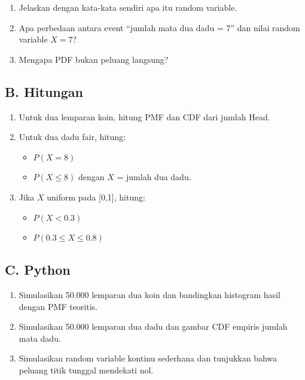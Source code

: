 \documentclass[
  letterpaper,
  DIV=11,
  numbers=noendperiod]{scrreprt}
\providecommand{\tightlist}{%
  \setlength{\itemsep}{0pt}\setlength{\parskip}{0pt}}
\begin{document}
\begin{enumerate}
\def\labelenumi{\arabic{enumi}.}
\tightlist
\item
  Jelaskan dengan kata-kata sendiri apa itu random variable.
\item
  Apa perbedaan antara event ``jumlah mata dua dadu = 7'' dan nilai
  random variable \(X=7\)?
\item
  Mengapa PDF bukan peluang langsung?
\end{enumerate}

\subsection{B. Hitungan}\label{b.-hitungan}

\begin{enumerate}
\def\labelenumi{\arabic{enumi}.}
\tightlist
\item
  Untuk dua lemparan koin, hitung PMF dan CDF dari jumlah Head.
\item
  Untuk dua dadu fair, hitung:

  \begin{itemize}
  \tightlist
  \item
    \(P(X=8)\)
  \item
    \(P(X\le 8)\) dengan \(X\) = jumlah dua dadu.
  \end{itemize}
\item
  Jika \(X\) uniform pada {[}0,1{]}, hitung:

  \begin{itemize}
  \tightlist
  \item
    \(P(X<0.3)\)
  \item
    \(P(0.3 \le X \le 0.8)\)
  \end{itemize}
\end{enumerate}

\subsection{C. Python}\label{c.-python}

\begin{enumerate}
\def\labelenumi{\arabic{enumi}.}
\tightlist
\item
  Simulasikan 50.000 lemparan dua koin dan bandingkan histogram hasil
  dengan PMF teoritis.
\item
  Simulasikan 50.000 lemparan dua dadu dan gambar CDF empiris jumlah
  mata dadu.
\item
  Simulasikan random variable kontinu sederhana dan tunjukkan bahwa
  peluang titik tunggal mendekati nol.
\end{enumerate}
\end{document}
